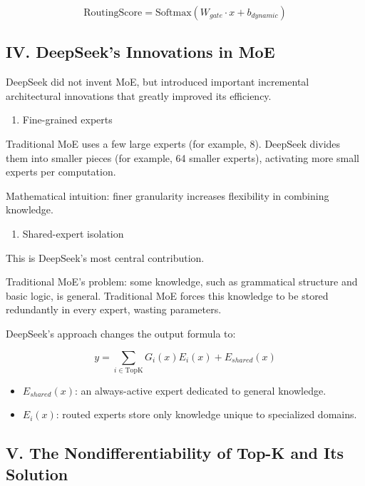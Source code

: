 \[
\mathrm{RoutingScore}=\mathrm{Softmax}(W_{gate}\cdot x+b_{dynamic})
\]

\hypertarget{iv.-deepseeks-innovations-in-moe}{%
\subsection{IV. DeepSeek's Innovations in MoE}\label{iv.-deepseeks-innovations-in-moe}}

DeepSeek did not invent MoE, but introduced important incremental architectural innovations that greatly improved its efficiency.

\begin{enumerate}
\def\labelenumi{\arabic{enumi}.}
\tightlist
\item
  Fine-grained experts
\end{enumerate}

Traditional MoE uses a few large experts (for example, 8). DeepSeek divides them into smaller pieces (for example, 64 smaller experts), activating more small experts per computation.

Mathematical intuition: finer granularity increases flexibility in combining knowledge.

\begin{enumerate}
\def\labelenumi{\arabic{enumi}.}
\setcounter{enumi}{1}
\tightlist
\item
  Shared-expert isolation
\end{enumerate}

This is DeepSeek's most central contribution.

Traditional MoE's problem: some knowledge, such as grammatical structure and basic logic, is general. Traditional MoE forces this knowledge to be stored redundantly in every expert, wasting parameters.

DeepSeek's approach changes the output formula to:

\[
y=\sum_{i\in \mathrm{TopK}}G_i(x)E_i(x)+E_{shared}(x)
\]

\begin{itemize}
\tightlist
\item
  \(E_{shared}(x)\): an always-active expert dedicated to general knowledge.
\item
  \(E_i(x)\): routed experts store only knowledge unique to specialized domains.
\end{itemize}

\hypertarget{v.-the-nondifferentiability-of-top-k-and-its-solution}{%
\subsection{V. The Nondifferentiability of Top-K and Its Solution}\label{v.-the-nondifferentiability-of-top-k-and-its-solution}}

